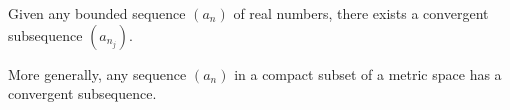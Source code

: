 \documentclass[12pt]{article}
\begin{document}
Given any bounded sequence $(a_n)$ of real numbers,
there exists a convergent subsequence $(a_{n_j})$.

More generally, any sequence $(a_n)$ in a compact subset of a metric space
has a convergent subsequence.
\end{document}
